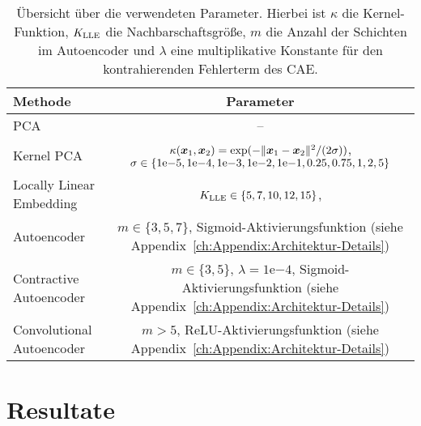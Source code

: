 \begin{table}[ht]
	\tymax=300pt
	\centering
	\begin{tabulary}{\textwidth}{LC}
		\toprule
		Methode                            & Parameter                                                            \\ \midrule
		PCA      & --                                                                   \\
		Kernel PCA                         & $\kappa(\bm{x}_1, \bm{x}_2) = \exp(- \lVert\bm{x}_1 - \bm{x}_2\rVert^2/(2\sigma))$, $\sigma \in \{1 \mathrm{e}{-5},1 \mathrm{e}{-4}, 1 \mathrm{e}{-3}, 1 \mathrm{e}{-2}, 1 \mathrm{e}{-1}, 0.25, 0.75, 1, 2, 5\}$ \\
		Locally Linear Embedding     & $K_{\text{LLE}} \in \{ 5, 7, 10, 12, 15\}$,                      \\
		Autoencoder                  & $m \in \{3, 5, 7\}$, Sigmoid-Aktivierungsfunktion \newline (siehe
		Appendix~\ref{ch:Appendix:Architektur-Details})                                                           \\  Contractive Autoencoder & $m \in \{3, 5\}$, $\lambda=1\mathrm{e}{-4}$,
		Sigmoid-Aktivierungsfunktion (siehe Appendix~\ref{ch:Appendix:Architektur-Details})                       \\
		Convolutional Autoencoder & $m > 5$, ReLU-Aktivierungsfunktion \newline (siehe
		Appendix~\ref{ch:Appendix:Architektur-Details})                                                           \\ \bottomrule
	\end{tabulary}
	\caption[Übersicht über die verwendeten Parameter der Methoden]{Übersicht über die verwendeten Parameter. Hierbei ist $\kappa$ die Kernel-Funktion, $K_{\text{LLE}}$ die Nachbarschaftsgröße, $m$ die Anzahl der Schichten im Autoencoder und $\lambda$ eine multiplikative Konstante für den kontrahierenden Fehlerterm des CAE.}
	\label{tab:uebersicht-parameter}
\end{table}
\section{Resultate}
\label{ch:Vergleich:sec:Resultate}

